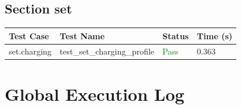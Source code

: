 \documentclass{article}
\begin{document}
\subsection{Section set}

\begin{longtable}{p{} p{} p{} p{}}
\toprule
\textbf{Test Case} & \textbf{Test Name} & \textbf{Status} & \textbf{Time (s)} \\
\midrule
\endhead
set.charging & test\_set\_charging\_profile & \textcolor{green}{Pass} & 0.363 \\
\bottomrule
\end{longtable}

\section{Global Execution Log}
\end{document}
